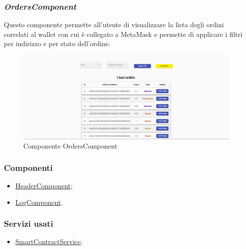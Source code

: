 \subsubsection*{\textit{OrdersComponent}}
\label{sec:orders-component}
Questo componente permette all'utente di visualizzare la lista degli ordini correlati al wallet con cui è collegato a MetaMask e permette di applicare i filtri per indirizzo e per stato dell'ordine.

\begin{figure}[!h] 
    \centering 
    \includegraphics[width=1\columnwidth]{immagini/componenti/orders.png} 
    \caption{Componente OrdersComponent}
\end{figure}

\subsubsection{Componenti}
\begin{itemize}
    \item \hyperref[sec:header-component]{HeaderComponent};
    \item \hyperref[sec:log-component]{LogComponent}.
\end{itemize}

\subsubsection{Servizi usati}
\begin{itemize}
    \item \hyperref[sec:smart-contract-service]{SmartContractService}.
\end{itemize}


